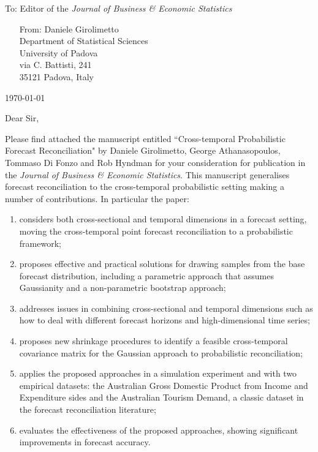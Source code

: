 \documentclass[11pt,a4paper]{letter}
\date{}
\begin{document}
 \begin{letter}{To: Editor of the \textit{Journal of Business \& Economic Statistics}}
\begin{itemize}
	\item[From:] Daniele Girolimetto\\ 
	Department of Statistical Sciences\\
	University of Padova\\
	via C. Battisti, 241\\ 35121 Padova, Italy
\end{itemize}

 \opening{\today\ \\}
 \medskip
Dear Sir,

Please find attached the manuscript entitled ``Cross-temporal Probabilistic Forecast Reconciliation" by Daniele Girolimetto, George Athanasopoulos, Tommaso Di Fonzo and Rob Hyndman for your consideration for publication in the \textit{Journal of Business \& Economic Statistics}. 
This manuscript generalises forecast reconciliation to the cross-temporal probabilistic setting making a number of contributions.
In particular the paper:
\begin{enumerate}
	\item considers both cross-sectional and temporal dimensions in a forecast setting, moving the cross-temporal point forecast reconciliation to a probabilistic framework;
	\item proposes effective and practical solutions for drawing samples from the base forecast distribution, including a parametric approach that assumes Gaussianity and a non-parametric bootstrap approach;
	\item addresses issues in combining cross-sectional and temporal dimensions such as how to deal with different forecast horizons and high-dimensional time series;
	\item proposes new shrinkage procedures to identify a feasible cross-temporal covariance matrix for the Gaussian approach to probabilistic reconciliation;
	\item applies the proposed approaches in a simulation experiment and with two empirical datasets: the Australian Gross Domestic Product from Income and Expenditure sides and the Australian Tourism Demand, a classic dataset in the forecast reconciliation literature;
	\item evaluates the effectiveness of the proposed approaches, showing significant improvements in forecast accuracy.
\end{enumerate}


\end{letter}
\end{document}
